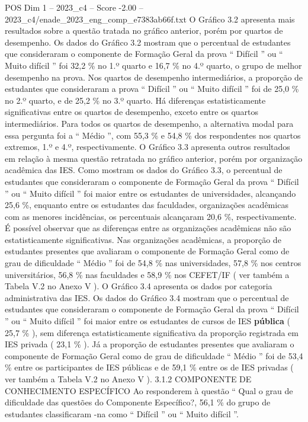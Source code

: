 \begin{textsample}{POS Dim 1 – 2023\_c4 – Score -2.00 – 2023\_c4/enade\_2023\_eng\_comp\_e7383ab66f.txt}
O Gráfico 3.2 apresenta mais resultados sobre a questão tratada no gráfico anterior, porém por quartos de desempenho.
Os dados do Gráfico 3.2 mostram que o percentual de estudantes que consideraram o componente de Formação Geral da prova “ Difícil ” ou “ Muito difícil ” foi 32,2 \% no 1.º quarto e 16,7 \% no 4.º quarto, o grupo de melhor desempenho na prova.
Nos quartos de desempenho intermediários, a proporção de estudantes que consideraram a prova “ Difícil ” ou “ Muito difícil ” foi de 25,0 \% no 2.º quarto, e de 25,2 \% no 3.º quarto.
Há diferenças estatisticamente significativas entre os quartos de desempenho, exceto entre os quartos intermediários.
Para todos os quartos de desempenho, a alternativa modal para essa pergunta foi a “ Médio ”, com 55,3 \% e 54,8 \% dos respondentes nos quartos extremos, 1.º e 4.º, respectivamente.
O Gráfico 3.3 apresenta outros resultados em relação à mesma questão retratada no gráfico anterior, porém por organização acadêmica das IES.
Como mostram os dados do Gráfico 3.3, o percentual de estudantes que consideraram o componente de Formação Geral da prova “ Difícil ” ou “ Muito difícil ” foi maior entre os estudantes de universidades, alcançando 25,6 \%, enquanto entre os estudantes das faculdades, organizações acadêmicas com as menores incidências, os percentuais alcançaram 20,6 \%, respectivamente.
É possível observar que as diferenças entre as organizações acadêmicas não são estatisticamente significativas.
Nas organizações acadêmicas, a proporção de estudantes presentes que avaliaram o componente de Formação Geral como de grau de dificuldade “ Médio ” foi de 54,8 \% nas universidades, 57,8 \% nos centros universitários, 56,8 \% nas faculdades e 58,9 \% nos CEFET/IF ( ver também a Tabela V.2 no Anexo V ).
O Gráfico 3.4 apresenta os dados por categoria administrativa das IES.
Os dados do Gráfico 3.4 mostram que o percentual de estudantes que consideraram o componente de Formação Geral da prova “ Difícil ” ou “ Muito difícil ” foi maior entre os estudantes de cursos de IES \textbf{pública} ( 25,7 \% ), sem diferença estatisticamente significativa da proporção registrada em IES privada ( 23,1 \% ).
Já a proporção de estudantes presentes que avaliaram o componente de Formação Geral como de grau de dificuldade “ Médio ” foi de 53,4 \% entre os participantes de IES públicas e de 59,1 \% entre os de IES privadas ( ver também a Tabela V.2 no Anexo V ). 3.1.2 COMPONENTE DE CONHECIMENTO ESPECÍFICO Ao responderem à questão “ Qual o grau de dificuldade das questões do Componente Específico?, 56,1 \% do grupo de estudantes classificaram -na como “ Difícil ” ou “ Muito difícil ”.

\end{textsample}
